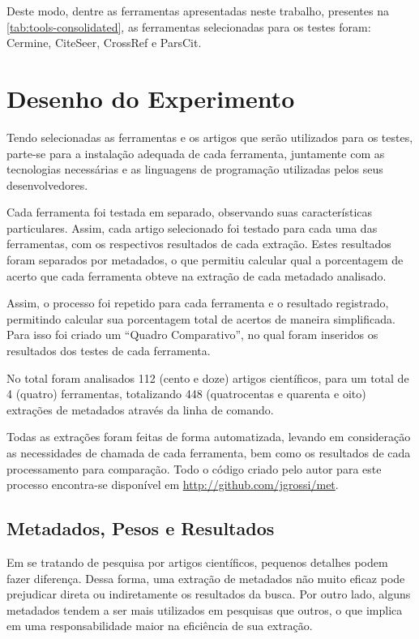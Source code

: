 Deste modo, dentre as ferramentas apresentadas neste trabalho, presentes na \autoref{tab:tools-consolidated}, as ferramentas selecionadas para os testes foram: Cermine, CiteSeer, CrossRef e ParsCit.
    
\section{Desenho do Experimento}
\label{sec:experiment-design}

Tendo selecionadas as ferramentas e os artigos que serão utilizados para os testes, parte-se para a instalação adequada de cada ferramenta, juntamente com as tecnologias necessárias e as linguagens de programação utilizadas pelos seus desenvolvedores. 

Cada ferramenta foi testada em separado, observando suas características particulares. Assim, cada artigo selecionado foi testado para cada uma das ferramentas, com os respectivos resultados de cada extração. Estes resultados foram separados por metadados, o que permitiu calcular qual a porcentagem de acerto que cada ferramenta obteve na extração de cada metadado analisado.

Assim, o processo foi repetido para cada ferramenta e o resultado registrado, permitindo calcular sua porcentagem total de acertos de maneira simplificada. Para isso foi criado um ``Quadro Comparativo'', no qual foram inseridos os resultados dos testes de cada ferramenta. 

No total foram analisados 112 (cento e doze) artigos científicos, para um total de 4 (quatro) ferramentas, totalizando 448 (quatrocentas e quarenta e oito) extrações de metadados através da linha de comando.

Todas as extrações foram feitas de forma automatizada, levando em consideração as necessidades de chamada de cada ferramenta, bem como os resultados de cada processamento para comparação. Todo o código criado pelo autor para este processo encontra-se disponível em \url{http://github.com/jgrossi/met}.

\subsection{Metadados, Pesos e Resultados}
\label{ssec:metadata-results}


Em se tratando de pesquisa por artigos científicos, pequenos detalhes podem fazer diferença. Dessa forma, uma extração de metadados não muito eficaz pode prejudicar direta ou indiretamente os resultados da busca. Por outro lado, alguns metadados tendem a ser mais utilizados em pesquisas que outros, o que implica em uma responsabilidade maior na eficiência de sua extração. 

